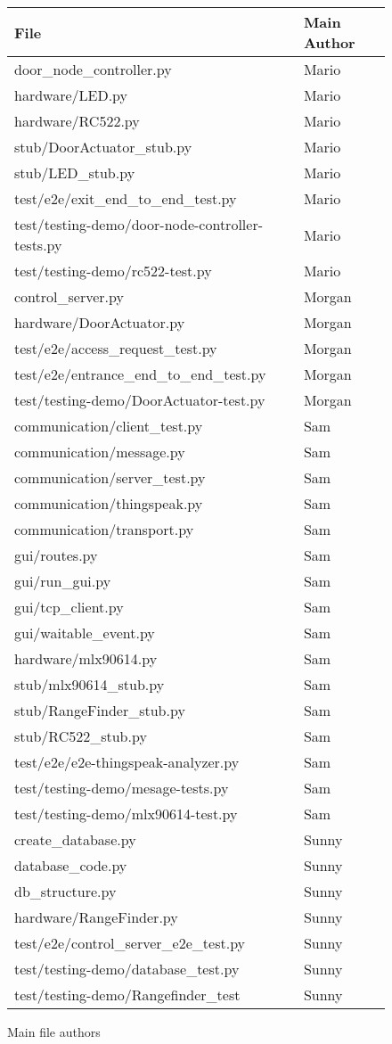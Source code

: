 \begin{figure}[!htb]
\centering
\begin{tabular}{ll}
File & Main Author\\
\hline
door\_node\_controller.py & Mario\\
hardware/LED.py & Mario\\
hardware/RC522.py & Mario\\
stub/DoorActuator\_stub.py & Mario\\
stub/LED\_stub.py & Mario\\
test/e2e/exit\_end\_to\_end\_test.py & Mario\\
test/testing-demo/door-node-controller-tests.py & Mario\\
test/testing-demo/rc522-test.py & Mario\\
control\_server.py & Morgan\\
hardware/DoorActuator.py & Morgan\\
test/e2e/access\_request\_test.py & Morgan\\
test/e2e/entrance\_end\_to\_end\_test.py & Morgan\\
test/testing-demo/DoorActuator-test.py & Morgan\\
communication/client\_test.py & Sam\\
communication/message.py & Sam\\
communication/server\_test.py & Sam\\
communication/thingspeak.py & Sam\\
communication/transport.py & Sam\\
gui/routes.py & Sam\\
gui/run\_gui.py & Sam\\
gui/tcp\_client.py & Sam\\
gui/waitable\_event.py & Sam\\
hardware/mlx90614.py & Sam\\
stub/mlx90614\_stub.py & Sam\\
stub/RangeFinder\_stub.py & Sam\\
stub/RC522\_stub.py & Sam\\
test/e2e/e2e-thingspeak-analyzer.py & Sam\\
test/testing-demo/mesage-tests.py & Sam\\
test/testing-demo/mlx90614-test.py & Sam\\
create\_database.py & Sunny\\
database\_code.py & Sunny\\
db\_structure.py & Sunny\\
hardware/RangeFinder.py & Sunny\\
test/e2e/control\_server\_e2e\_test.py & Sunny\\
test/testing-demo/database\_test.py & Sunny\\
test/testing-demo/Rangefinder\_test & Sunny\\
\end{tabular}
\caption{Main file authors}
\label{fig:file-authors}
\end{figure}

